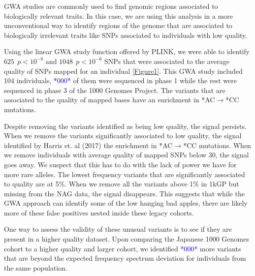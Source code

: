 \documentclass[9pt,lineno]{elife}
\newcommand{\todo}[1]{\textcolor{blue}{*#1*}}
\begin{document}
GWA studies are commonly used to find genomic regions associated to biologically relevant traits. In this case, we are using this analysis in a more unconventional way to identify regions of the genome that are associated to biologically irrelevant traits like SNPs associated to individuals with low quality.
 
Using the linear GWA study function offered by PLINK, we were able to identify $625\ \  p < 10^{-8}$ and $1048\ \ p < 10^{-6}$ SNPs that were associated to the average quality of SNPs mapped for an individual \ref{Figure1}.  This GWA study included 104 individuals, \todo{000} of them were sequenced in phase 1 while the rest were sequenced in phase 3 of the 1000 Genomes Project.
The variants that are associated to the quality of mapped bases have an enrichment in *AC${\rightarrow}$*CC mutations. 

Despite removing the variants identified as being low quality, the signal persists. 
When we remove the variants significantly associated to low quality, the signal identified by Harris et. al (2017) the enrichment in *AC${\rightarrow}$*CC mutations. 
When we remove individuals with average quality of mapped SNPs below 30, the signal goes away. 
We suspect that this has to do with the lack of power we have for more rare alleles. 
The lowest frequency variants that are significantly associated to quality are at 5\%. 
When we remove all the variants above 1\% in 1kGP but missing from the NAG data, the signal disappears.
This suggests that while the GWA approach can identify some of the low hanging bad apples, there are likely more of these false positives nested inside these legacy cohorts. 

One way to assess the validity of these unusual variants is to see if they are present in a higher quality dataset. Upon comparing the Japanese 1000 Genomes cohort to a higher quality and larger cohort, we identified \todo{000} more variants that are beyond the expected frequency spectrum deviation for individuals from the same population. 
\end{document}
